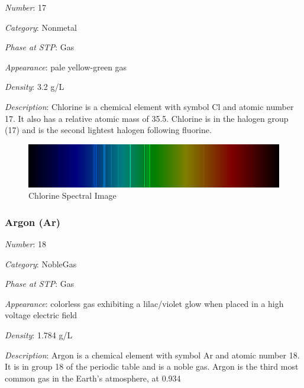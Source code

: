 \documentclass{article}
\begin{document}
\textit{Number}: 17

\textit{Category}: Nonmetal

\textit{Phase at STP}: Gas

\textit{Appearance}: pale yellow-green gas

\textit{Density}: 3.2 g/L

\textit{Description}: Chlorine is a chemical element with symbol Cl and atomic number 17. It also has a relative atomic mass of 35.5. Chlorine is in the halogen group (17) and is the second lightest halogen following fluorine.

\immediate{}
\begin{figure}[!ht]
    \centering
    \includegraphics[width=12cm]{./resources/spectral_img/Chlorine_spectrum_visible.png}
    \caption{Chlorine Spectral Image}
\end{figure}

\hypertarget{subsubsection::Ar}{}\subsubsection{Argon (Ar)}

\textit{Number}: 18

\textit{Category}: NobleGas

\textit{Phase at STP}: Gas

\textit{Appearance}: colorless gas exhibiting a lilac/violet glow when placed in a high voltage electric field

\textit{Density}: 1.784 g/L

\textit{Description}: Argon is a chemical element with symbol Ar and atomic number 18. It is in group 18 of the periodic table and is a noble gas. Argon is the third most common gas in the Earth's atmosphere, at 0.934%
\end{document}
